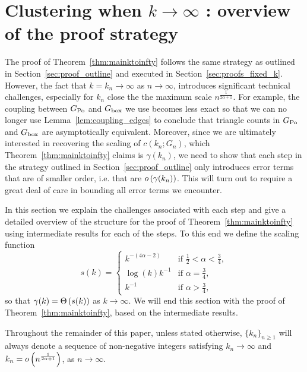 
\section{Clustering when $k\to\infty$ : overview of the proof strategy}

The proof of Theorem~\ref{thm:mainktoinfty} follows the same strategy as outlined in Section~\ref{sec:proof_outline} and executed in Section~\ref{sec:proofs_fixed_k}. However, the fact that $k = k_n \to \infty$ as $n \to \infty$, introduces significant technical challenges, especially for $k_n$ close the the maximum scale $n^{\frac{1}{2\alpha + 1}}$. For example, the coupling between $G_{{\mathrm{Po}}}$ and $G_{\mathrm{box}}$ we use becomes less exact so that we can no longer use Lemma~\ref{lem:coupling_edges} to conclude that triangle counts in $G_{{\mathrm{Po}}}$ and $G_{\mathrm{box}}$ are asymptotically equivalent. Moreover, since we are ultimately interested in recovering the scaling of $c(k_n;G_n)$, which Theorem~\ref{thm:mainktoinfty} claims is $\gamma(k_n)$, we need to show that each step in the strategy outlined in Section~\ref{sec:proof_outline} only introduces error terms that are of smaller order, i.e. that are $o\left(\gamma(k_n)\right)$. This will turn out to require a great deal of care in bounding all error terms we encounter.

In this section we explain the challenges associated with each step and give a detailed overview of the structure for the proof of Theorem~\ref{thm:mainktoinfty} using intermediate results for each of the steps. To this end we define the scaling function
\begin{equation}\label{eq:def_scaling_function}
	s(k) = \begin{cases}
		k^{-(4\alpha - 2)} &\mbox{if } \frac{1}{2} < \alpha < \frac{3}{4},\\
		\log(k) k^{-1} &\mbox{if } \alpha = \frac{3}{4},\\
		k^{-1} &\mbox{if } \alpha > \frac{3}{4},
	\end{cases}
\end{equation}
so that $\gamma(k) = \Theta\left(s(k)\right)$ as $k \to \infty$. We will end this section with the proof of Theorem~\ref{thm:mainktoinfty}, based on the intermediate results.

\begin{remark}[Diverging $k_n$]
Throughout the remainder of this paper, unless stated otherwise, $\{k_n\}_{n \ge 1}$ will always denote a sequence of non-negative integers satisfying $k_n \to \infty$ and $k_n = o\left(n^{\frac{1}{2\alpha + 1}}\right)$, as $n \to \infty$.
\end{remark}

